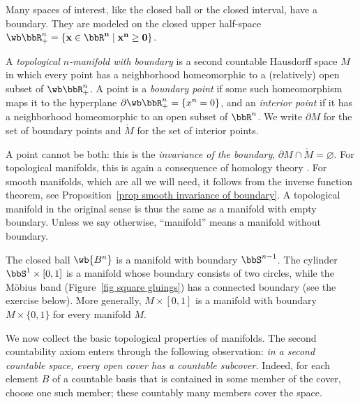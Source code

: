 Many spaces of interest, like the closed ball or the closed interval, have a boundary. They are modeled on the closed upper half-space $\wb\bbR^n_+=\{\bf{x}\in\bbR^n\mid x^n\geq0\}$.

\begin{defn}
    A \emph{topological $n$-manifold with boundary} is a second countable Hausdorff space $M$ in which every point has a neighborhood homeomorphic to a (relatively) open subset of $\wb\bbR^n_+$. A point is a \emph{boundary point} if some such homeomorphism maps it to the hyperplane $\partial\wb\bbR^n_+=\{x^n=0\}$, and an \emph{interior point} if it has a neighborhood homeomorphic to an open subset of $\bbR^n$. We write $\partial M$ for the set of boundary points and $\mathring M$ for the set of interior points.
\end{defn}
A point cannot be both: this is the \emph{invariance of the boundary}, $\partial M\cap\mathring M=\varnothing$. For topological manifolds, this is again a consequence of homology theory \cite[Thm.~1.37]{Lee}. For smooth manifolds, which are all we will need, it follows from the inverse function theorem, see Proposition~\ref{prop smooth invariance of boundary}. A topological manifold in the original sense is thus the same as a manifold with empty boundary. Unless we say otherwise, ``manifold'' means a manifold without boundary.

\begin{example}
    The closed ball $\wb{B^n}$ is a manifold with boundary $\bbS^{n-1}$. The cylinder $\bbS^1\times[0,1]$ is a manifold whose boundary consists of two circles, while the M\"obius band (Figure~\ref{fig square gluings}) has a connected boundary (see the exercise below). More generally, $M\times[0,1]$ is a manifold with boundary $M\times\{0,1\}$ for every manifold $M$.
\end{example}

We now collect the basic topological properties of manifolds. The second countability axiom enters through the following observation: \emph{in a second countable space, every open cover has a countable subcover.} Indeed, for each element $B$ of a countable basis that is contained in some member of the cover, choose one such member; these countably many members cover the space.

